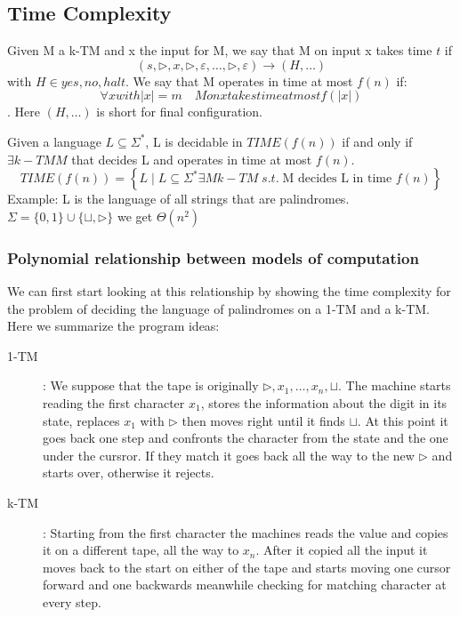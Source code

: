 \subsection{Time Complexity}
\begin{definition}
    Given M a k-TM and x the input for M, we say that M on input x takes time $t$ if
    \[ 
        (s, \triangleright, x, \triangleright, \varepsilon, \ldots, \triangleright, \varepsilon) \longrightarrow ( H,\ldots) 
    \] 
    with $ H \in {yes, no, halt} $. We say that M operates in time at most $ f(n) $ if: \[ 
    \forall x with |x| = m \quad M on x takes time at most f(|x|) 
    \]. Here $( H,\ldots)$ is short for final configuration.
\end{definition}
\begin{definition}
    Given a language $L \subseteq \Sigma^*$, L is decidable in $ TIME(f(n))$ if and only if  $\exists k-TM M$ that decides L and operates in time at most $f(n)$.
    \[ 
        TIME(f(n)) = \left\{ L \mid L\subseteq \Sigma^* \exists M k-TM\; s.t. \; \text{M decides L in time } f(n) \right\} 
    \]
    Example: L is the language of all strings that are palindromes. $ \Sigma = \{0,1\}\cup\{\sqcup, \triangleright\} $ we get $ \Theta(n^2) $
\end{definition}
\subsubsection{Polynomial relationship between models of computation}
We can first start looking at this relationship by showing the time complexity for the problem of deciding the language of palindromes on a 1-TM and a k-TM. Here we summarize the program ideas:
\begin{description}
    \item[1-TM]: We suppose that the tape is originally $\triangleright, x_{1}, \ldots,x_{n}, \sqcup$. The machine starts reading the first character $x_1$, stores the information about the digit in its state, replaces $x_1$ with $\triangleright$ then moves right until it finds $\sqcup$. At this point it goes back one step and confronts the character from the state and the one under the cursror. If they match it goes back all the way to the new $\triangleright$ and starts over, otherwise it rejects.
    \item[k-TM]: Starting from the first character the machines reads the value and copies it on a different tape, all the way to $x_n$. After it copied all the input it moves back to the start on either of the tape and starts moving one cursor forward and one backwards meanwhile checking for matching character at every step.
\end{description}

